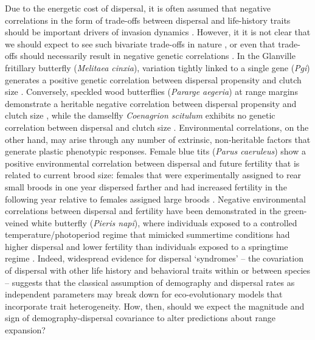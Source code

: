 \documentclass[11pt]{article}
\begin{document}
Due to the energetic cost of dispersal, it is often assumed that negative correlations in the form of trade-offs between dispersal and life-history traits should be important drivers of invasion dynamics \citep{hanski_dispersal-related_2006,chuang_expanding_2016}.
However, it it is not clear that we should expect to see such bivariate trade-offs in nature \citep{saltz_trait_2017}, or even that trade-offs should necessarily result in negative genetic correlations \citep{houle_genetic_1991}.
In the Glanville fritillary butterfly (\textit{Melitaea cinxia}), variation tightly linked to a single gene (\textit{Pgi}) generates a positive genetic correlation between dispersal propensity and clutch size \citep{hanski_dispersal-related_2006,bonte_dispersal_2012}.
Conversely, speckled wood butterflies (\textit{Pararge aegeria}) at range margins demonstrate a heritable negative correlation between dispersal propensity and clutch size \citep{hughes_evolutionary_2003}, while the damselfly \textit{Coenagrion scitulum} exhibits no genetic correlation between dispersal and clutch size \citep{therry_higher_2014}.
Environmental correlations, on the other hand, may arise through any number of extrinsic, non-heritable factors that generate plastic phenotypic responses.
Female blue tits (\textit{Parus caeruleus}) show a positive environmental correlation between dispersal and future fertility that is related to current brood size: females that were experimentally assigned to rear small broods in one year dispersed farther and had increased fertility in the following year relative to females assigned large broods \citep{nur_consequences_1988}.
Negative environmental correlations between dispersal and fertility have been demonstrated in the green-veined white butterfly (\textit{Pieris napi}), where individuals exposed to a controlled temperature/photoperiod regime that mimicked summertime conditions had higher dispersal and lower fertility than individuals exposed to a springtime regime \citep{karlsson_seasonal_2008}.
Indeed, widespread evidence for dispersal `syndromes' -- the covariation of dispersal with other life history and behavioral traits within \citep{clobert2009informed} or between \citep{comte2018evidence} species -- suggests that the classical assumption of demography and dispersal rates as independent parameters may break down for eco-evolutionary models that incorporate trait heterogeneity.
How, then, should we expect the magnitude and sign of demography-dispersal covariance to alter predictions about range expansion?
\end{document}
